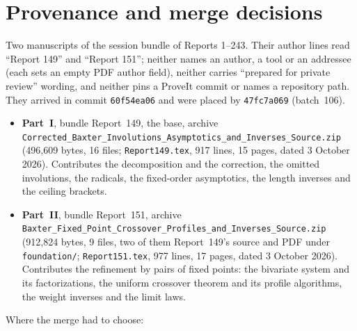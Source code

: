 \documentclass[11pt,letterpaper]{article}
\numberwithin{equation}{section}
\theoremstyle{remark}\newtheorem{remark}[theorem]{Remark}
\newcommand{\file}[1]{\nolinkurl{#1}}
\begin{document}
\section*{Provenance and merge decisions}\label{abx:sec:provenance}
Two manuscripts of the session bundle of Reports 1--243. Their author lines read ``Report 149'' and ``Report 151''; neither names an author, a tool or an addressee (each sets an empty PDF author field), neither carries ``prepared for private review'' wording, and neither pins a ProveIt commit or names a repository path. They arrived in commit \texttt{60f54ea06} and were placed by \texttt{47fc7a069} (batch~106).
\begin{itemize}
\item \textbf{Part~I}, bundle Report~149, the base, archive \file{Corrected_Baxter_Involutions_Asymptotics_and_Inverses_Source.zip} (496,609 bytes, 16 files; \file{Report149.tex}, 917 lines, 15 pages, dated 3 October 2026). Contributes the decomposition and the correction, the omitted involutions, the radicals, the fixed-order asymptotics, the length inverses and the ceiling brackets.
\item \textbf{Part~II}, bundle Report~151, archive \file{Baxter_Fixed_Point_Crossover_Profiles_and_Inverses_Source.zip} (912,824 bytes, 9 files, two of them Report~149's source and PDF under \file{foundation/}; \file{Report151.tex}, 977 lines, 17 pages, dated 3 October 2026). Contributes the refinement by pairs of fixed points: the bivariate system and its factorizations, the uniform crossover theorem and its profile algorithms, the weight inverses and the limit laws.
\end{itemize}
Where the merge had to choose:
\end{document}

